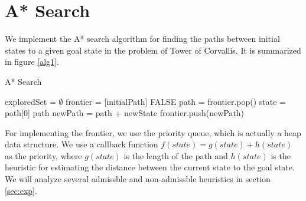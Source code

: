 \section{A* Search}\label{sec:astar}


We implement the A* search algorithm for finding the paths between initial states to a given goal state in the problem of Tower of Corvallis. It is summarized in figure \ref{alg1}.

\begin{algorithm}[H]
\caption{A* Search}
\label{alg1}
\begin{algorithmic}
\STATE exploredSet = $\emptyset$ 
\STATE frontier = [initialPath]
    \RETURN FALSE
\ENDIF
\STATE path = frontier.pop()
\STATE state = path[0]
    \RETURN path
\ENDIF
{}
        \STATE newPath = path + newState
            \STATE frontier.push(newPath)
        \ENDIF
    \ENDFOR
\ENDFOR
\ENDWHILE
\end{algorithmic}
\end{algorithm}

For implementing the frontier, we use the priority queue, which is actually a heap data structure. We use a callback function $f(state) = g(state) + h(state)$ as the priority, where $g(state)$ is the length of the path and $h(state)$ is the heuristic for estimating the distance between the current state to the goal state. We will analyze several admissble and non-admissble heuristics in section \ref{sec:exp}.

